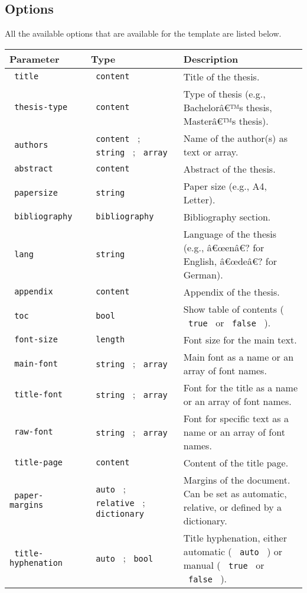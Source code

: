 \subsection{Options}\label{options}

All the available options that are available for the template are listed
below.

\begin{longtable}[]{@{}lll@{}}
\toprule\noalign{}
Parameter & Type & Description \\
\midrule\noalign{}
\endhead
\bottomrule\noalign{}
\endlastfoot
\texttt{\ title\ } & \texttt{\ content\ } & Title of the thesis. \\
\texttt{\ thesis-type\ } & \texttt{\ content\ } & Type of thesis (e.g.,
Bachelorâ€™s thesis, Masterâ€™s thesis). \\
\texttt{\ authors\ } & \texttt{\ content\ } ; \texttt{\ string\ } ;
\texttt{\ array\ } & Name of the author(s) as text or array. \\
\texttt{\ abstract\ } & \texttt{\ content\ } & Abstract of the
thesis. \\
\texttt{\ papersize\ } & \texttt{\ string\ } & Paper size (e.g., A4,
Letter). \\
\texttt{\ bibliography\ } & \texttt{\ bibliography\ } & Bibliography
section. \\
\texttt{\ lang\ } & \texttt{\ string\ } & Language of the thesis (e.g.,
â€œenâ€? for English, â€œdeâ€? for German). \\
\texttt{\ appendix\ } & \texttt{\ content\ } & Appendix of the
thesis. \\
\texttt{\ toc\ } & \texttt{\ bool\ } & Show table of contents (
\texttt{\ true\ } or \texttt{\ false\ } ). \\
\texttt{\ font-size\ } & \texttt{\ length\ } & Font size for the main
text. \\
\texttt{\ main-font\ } & \texttt{\ string\ } ; \texttt{\ array\ } & Main
font as a name or an array of font names. \\
\texttt{\ title-font\ } & \texttt{\ string\ } ; \texttt{\ array\ } &
Font for the title as a name or an array of font names. \\
\texttt{\ raw-font\ } & \texttt{\ string\ } ; \texttt{\ array\ } & Font
for specific text as a name or an array of font names. \\
\texttt{\ title-page\ } & \texttt{\ content\ } & Content of the title
page. \\
\texttt{\ paper-margins\ } & \texttt{\ auto\ } ; \texttt{\ relative\ } ;
\texttt{\ dictionary\ } & Margins of the document. Can be set as
automatic, relative, or defined by a dictionary. \\
\texttt{\ title-hyphenation\ } & \texttt{\ auto\ } ; \texttt{\ bool\ } &
Title hyphenation, either automatic ( \texttt{\ auto\ } ) or manual (
\texttt{\ true\ } or \texttt{\ false\ } ). \\
\end{longtable}

